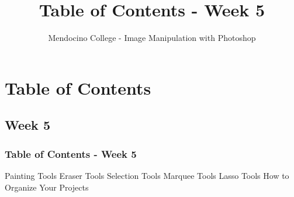 \documentclass{beamer}
\title{Table of Contents - Week 5}
\author{Mendocino College - Image Manipulation with Photoshop}
\date{\vspace{-5em}}
\begin{document}
	{
		\begin{frame}
			\vspace{-35pt}
			\maketitle
		\end{frame}
	}

	\section{Table of Contents}

	
			\subsection{Week 5}		
	\begin{frame}
		\frametitle{Table of Contents - Week 5}
	\begin{outline}
		\1 Painting Tools
		\1 Eraser Tools
		\1 Selection Tools
		\1 Marquee Tools
		\1 Lasso Tools
		\1 How to Organize Your Projects
	\end{outline}
		\end{frame}
	
\end{document}
